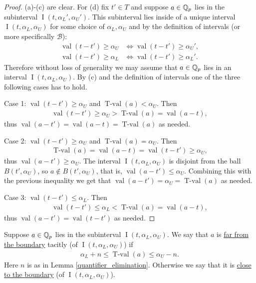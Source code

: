 \documentclass{amsart}
\newcommand{\BB}{\mathscr B}
\DeclareMathOperator{\val}{val}
\DeclareMathOperator{\vval}{val}
\DeclareMathOperator{\tval}{T-val}
\DeclareMathOperator{\inti}{I}
\newcommand{\defn}{\underline}
\newcommand{\interval}{\inti(t, \alpha_L, \alpha_U)}
\begin{document}
\begin{proof}
  (a)-(c) are clear.
  For (d) fix $t' \in T$ and suppose $a \in \mathbb{Q}_p$ lies in the subinterval $\inti(t, \alpha_L', \alpha_U')$.
  This  subinterval lies inside of a unique interval $\interval$ for some choice of $\alpha_L, \alpha_U$ and
  by the definition of intervals (or more specifically $\BB$):
  \begin{align*}
    \vval(t - t') \geq \alpha_U &\iff \vval(t - t') \geq \alpha_U',\\
    \vval(t - t') \geq \alpha_L &\iff \vval(t - t') \geq \alpha_L'.
  \end{align*}
  Therefore without loss of generality we may assume that $a \in \mathbb{Q}_p$ lies in an interval $\interval$.
  By (c) and the definition of intervals one of the three following cases has to hold.
  
  Case 1: $\vval(t - t') \geq \alpha_U$ and $\tval(a) < \alpha_U$. Then
  \begin{align*}
    \vval(t - t') \geq \alpha_U > \tval(a) = \vval(a - t),
  \end{align*}
  thus $\vval(a - t') = \vval(a - t) = \tval(a)$ as needed.

  Case 2: $\vval(t - t') \geq \alpha_U$ and $\tval(a) = \alpha_U$. Then
  \begin{align*}
    \tval(a) = \vval(a - t) = \vval(t - t') \geq \alpha_U,
  \end{align*}
  thus $\vval(a - t') \geq \alpha_U$.
  The interval $\interval$ is disjoint from the ball $B(t', \alpha_U)$,
  so $a \notin B(t', \alpha_U)$, that is, $\val(a - t') \leq \alpha_U$.
  Combining this with the previous inequality we get that $\val(a - t') = \alpha_U = \tval(a)$ as needed.

  Case 3: $\vval(t - t') \leq \alpha_L$. Then
  \begin{align*}
    \vval(t - t') \leq \alpha_L < \tval(a) = \vval(a - t),
  \end{align*}
  thus $\vval(a - t') = \vval(t - t')$ as needed. 
\end{proof}




\begin{Definition}
  Suppose $a \in \mathbb{Q}_p$ lies in the subinterval $\interval$.
  We say that $a$ is \defn{far from the boundary} tacitly (of $\interval$) if 
    \begin{align*}
	\alpha_L + n \leq \tval(a) \leq \alpha_U - n.
    \end{align*}
  Here $n$ is as in Lemma \ref{quantifier_elimination}.
  Otherwise we say that it is \defn{close to the boundary} (of $\interval$).
\end{Definition}
\end{document}
